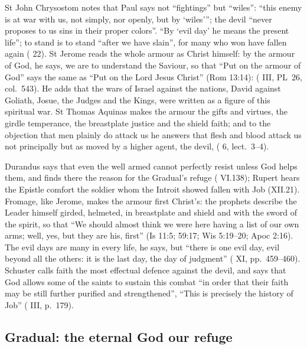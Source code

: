 St John Chrysostom notes that Paul says not ``fightings'' but ``wiles'': ``this
enemy is at war with us, not simply, nor openly, but by `wiles'''; the devil
``never proposes to us sins in their proper colors''. ``By `evil day' he means
the present life''; to stand is to stand ``after we have slain'', for many who
won have fallen again ( 22). St Jerome reads the
whole armour as Christ himself: by the armour of God, he says, we are to
understand the Saviour, so that ``Put on the armour of God'' says the same as
``Put on the Lord Jesus Christ'' (Rom 13:14):  ( III, PL~26,
col.~543). He adds that the wars of Israel against the nations, David against
Goliath, Josue, the Judges and the Kings, were written as a figure of this
spiritual war. St Thomas Aquinas makes the armour the gifts and virtues, the
girdle temperance, the breastplate justice and the shield faith; and to the
objection that men plainly do attack us he answers that flesh and blood attack
us not principally but as moved by a higher agent, the devil,  ( 6, lect.~3--4).

Durandus says that even the well armed cannot perfectly resist unless God
helps them, and finds there the reason for the Gradual's refuge (
VI.138); Rupert hears the Epistle comfort the soldier whom the Introit showed
fallen with Job (XII.21). Fromage, like Jerome, makes the armour first Christ's:
the prophets describe the Leader himself girded, helmeted, in breastplate and
shield and with the sword of the spirit, so that ``We should almost think we were
here having a list of our own arms; well, yes, but they are his, first'' (Is
11:5; 59:17; Wis 5:19--20; Apoc 2:16). The evil days are many in
every life, he says, but ``there is one evil day, evil beyond all the others: it
is the last day, the day of judgment'' ( XI,
pp.~459--460). Schuster calls faith the most effectual defence against the
devil, and says that God allows some of the saints to sustain this combat ``in
order that their faith may be still further purified and strengthened'', ``This
is precisely the history of Job'' ( III, p.~179).

\subsection{Gradual: the eternal God our refuge}

